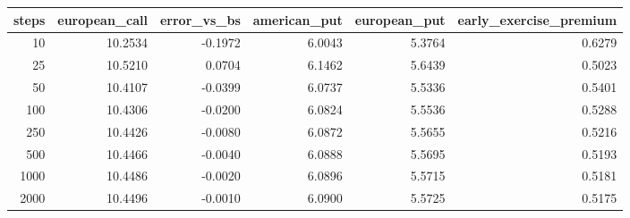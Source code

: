 \begin{tabular}{rrrrrr}
\toprule
steps & european_call & error_vs_bs & american_put & european_put & early_exercise_premium \\
\midrule
10 & 10.2534 & -0.1972 & 6.0043 & 5.3764 & 0.6279 \\
25 & 10.5210 & 0.0704 & 6.1462 & 5.6439 & 0.5023 \\
50 & 10.4107 & -0.0399 & 6.0737 & 5.5336 & 0.5401 \\
100 & 10.4306 & -0.0200 & 6.0824 & 5.5536 & 0.5288 \\
250 & 10.4426 & -0.0080 & 6.0872 & 5.5655 & 0.5216 \\
500 & 10.4466 & -0.0040 & 6.0888 & 5.5695 & 0.5193 \\
1000 & 10.4486 & -0.0020 & 6.0896 & 5.5715 & 0.5181 \\
2000 & 10.4496 & -0.0010 & 6.0900 & 5.5725 & 0.5175 \\
\bottomrule
\end{tabular}
